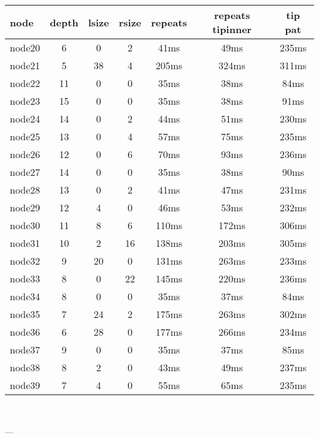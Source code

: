 \begin{tabular}{|l|c|c|c|c|c|c|}
\hline node & depth & lsize & rsize  & repeats & repeats tipinner & tip pat\\
    \hline node20 & 6 & 0 & 2 & 41ms & 49ms & 235ms\\
    \hline node21 & 5 & 38 & 4 & 205ms & 324ms & 311ms\\
    \hline node22 & 11 & 0 & 0 & 35ms & 38ms & 84ms\\
    \hline node23 & 15 & 0 & 0 & 35ms & 38ms & 91ms\\
    \hline node24 & 14 & 0 & 2 & 44ms & 51ms & 230ms\\
    \hline node25 & 13 & 0 & 4 & 57ms & 75ms & 235ms\\
    \hline node26 & 12 & 0 & 6 & 70ms & 93ms & 236ms\\
    \hline node27 & 14 & 0 & 0 & 35ms & 38ms & 90ms\\
    \hline node28 & 13 & 0 & 2 & 41ms & 47ms & 231ms\\
    \hline node29 & 12 & 4 & 0 & 46ms & 53ms & 232ms\\
    \hline node30 & 11 & 8 & 6 & 110ms & 172ms & 306ms\\
    \hline node31 & 10 & 2 & 16 & 138ms & 203ms & 305ms\\
    \hline node32 & 9 & 20 & 0 & 131ms & 263ms & 233ms\\
    \hline node33 & 8 & 0 & 22 & 145ms & 220ms & 236ms\\
    \hline node34 & 8 & 0 & 0 & 35ms & 37ms & 84ms\\
    \hline node35 & 7 & 24 & 2 & 175ms & 263ms & 302ms\\
    \hline node36 & 6 & 28 & 0 & 177ms & 266ms & 234ms\\
    \hline node37 & 9 & 0 & 0 & 35ms & 37ms & 85ms\\
    \hline node38 & 8 & 2 & 0 & 43ms & 49ms & 237ms\\
    \hline node39 & 7 & 4 & 0 & 55ms & 65ms & 235ms\\

\hline
\end{tabular} \

---


